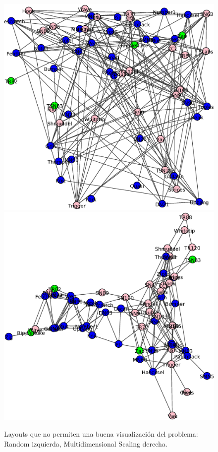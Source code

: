 \begin{figure}
\centering
\includegraphics[scale = 0.25]{figuras/Random.eps}
\includegraphics[scale = 0.25]{figuras/Multi.eps}
\caption{Layouts que no permiten una buena visualización del problema: Random izquierda, Multidimensional Scaling derecha.}
\label{fig:Layout_malos}
\end{figure}


